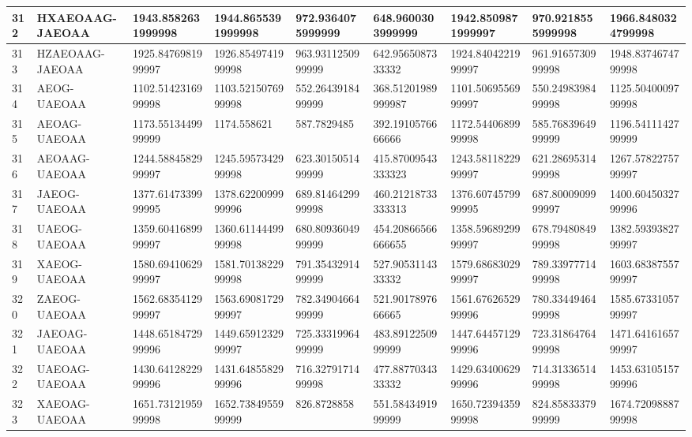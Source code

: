 {\begin{longtable}{|l|l|l|l|l|l|l|l|l|}
        312 & HXAEOAAG-JAEOAA & 1943.8582631999998 & 1944.8655391999998 & 972.9364075999999 & 648.9600303999999 & 1942.8509871999997 & 970.9218555999998 & 1966.8480324799998 \\ \hline
        313 & HZAEOAAG-JAEOAA & 1925.8476981999997 & 1926.8549741999998 & 963.9311250999999 & 642.9565087333332 & 1924.8404221999997 & 961.9165730999998 & 1948.8374674799998 \\ \hline
        314 & AEOG-UAEOAA & 1102.5142316999998 & 1103.5215076999998 & 552.2643918499999 & 368.51201989999987 & 1101.5069556999997 & 550.2498398499998 & 1125.5040009799998 \\ \hline
        315 & AEOAG-UAEOAA & 1173.5513449999999 & 1174.558621 & 587.7829485 & 392.1910576666666 & 1172.5440689999998 & 585.7683964999999 & 1196.5411142799999 \\ \hline
        316 & AEOAAG-UAEOAA & 1244.5884582999997 & 1245.5957342999998 & 623.3015051499999 & 415.87009543333323 & 1243.5811822999997 & 621.2869531499998 & 1267.5782275799997 \\ \hline
        317 & JAEOG-UAEOAA & 1377.6147339999995 & 1378.6220099999996 & 689.8146429999998 & 460.21218733333313 & 1376.6074579999995 & 687.8000909999997 & 1400.6045032799996 \\ \hline
        318 & UAEOG-UAEOAA & 1359.6041689999997 & 1360.6114449999998 & 680.8093604999999 & 454.20866566666655 & 1358.5968929999997 & 678.7948084999998 & 1382.5939382799997 \\ \hline
        319 & XAEOG-UAEOAA & 1580.6941062999997 & 1581.7013822999998 & 791.3543291499999 & 527.9053114333332 & 1579.6868302999997 & 789.3397771499998 & 1603.6838755799997 \\ \hline
        320 & ZAEOG-UAEOAA & 1562.6835412999997 & 1563.6908172999997 & 782.3490466499999 & 521.9017897666665 & 1561.6762652999996 & 780.3344946499998 & 1585.6733105799997 \\ \hline
        321 & JAEOAG-UAEOAA & 1448.6518472999996 & 1449.6591232999997 & 725.3331996499999 & 483.8912250999999 & 1447.6445712999996 & 723.3186476499998 & 1471.6416165799997 \\ \hline
        322 & UAEOAG-UAEOAA & 1430.6412822999996 & 1431.6485582999996 & 716.3279171499998 & 477.8877034333332 & 1429.6340062999996 & 714.3133651499998 & 1453.6310515799996 \\ \hline
        323 & XAEOAG-UAEOAA & 1651.7312195999998 & 1652.7384955999999 & 826.8728858 & 551.5843491999999 & 1650.7239435999998 & 824.8583337999999 & 1674.7209888799998 \\ \hline

\end{longtable}}
